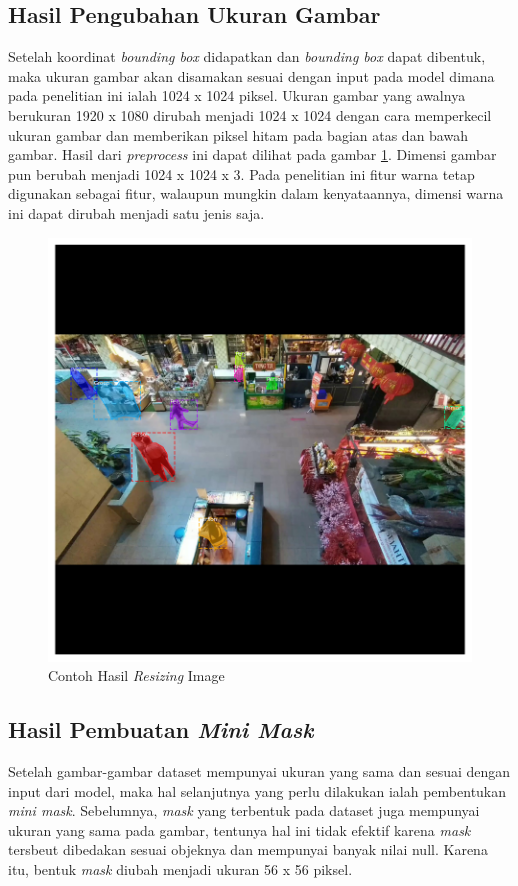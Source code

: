 \subsection{Hasil Pengubahan Ukuran Gambar}
Setelah koordinat \textit{bounding box} didapatkan dan \textit{bounding box} dapat dibentuk, maka ukuran gambar akan
disamakan sesuai dengan input pada model dimana pada penelitian ini ialah 1024 x 1024 piksel. Ukuran gambar yang awalnya
berukuran 1920 x 1080 dirubah menjadi 1024 x 1024 dengan cara memperkecil ukuran gambar dan memberikan piksel
hitam pada bagian atas dan bawah gambar. Hasil dari \textit{preprocess} ini dapat dilihat pada gambar 
\ref{fig: Contoh Resize Image}. Dimensi gambar pun berubah menjadi 1024 x 1024 x 3. Pada penelitian  ini
fitur warna tetap digunakan sebagai fitur, walaupun mungkin dalam kenyataannya, dimensi warna ini dapat dirubah
menjadi satu jenis saja.

\begin{figure}[h!]
  \begin{center}
    \includegraphics[width= 0.65\linewidth]{bab4/Resize Image.png}
    \caption{Contoh Hasil \textit{Resizing} Image}
    \label{fig: Contoh Resize Image}
  \end{center}
\end{figure}


\subsection{Hasil Pembuatan \textit{Mini Mask}}
Setelah gambar-gambar dataset mempunyai ukuran yang sama dan sesuai dengan input dari model, maka hal selanjutnya
yang perlu dilakukan ialah pembentukan \textit{mini mask}. Sebelumnya, \textit{mask} yang terbentuk pada dataset
juga mempunyai ukuran yang sama pada gambar, tentunya hal ini tidak efektif karena \textit{mask} tersbeut dibedakan
sesuai objeknya dan mempunyai banyak nilai null. Karena itu, bentuk \textit{mask} diubah menjadi ukuran 56 x 56 piksel.

